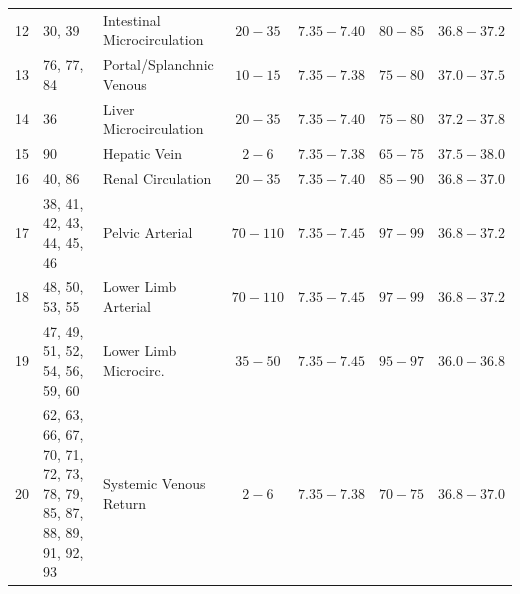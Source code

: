 \documentclass[sigconf]{acmart}
\begin{document}
\begin{table}[htbp]
\begin{tabular}{@{} c p{5.3cm} | l c c c c @{}}
    12 & 30, 39 & Intestinal Microcirculation & $20{-}35$ & $7.35{-}7.40$ & $80{-}85$ & $36.8{-}37.2$ \\ 
    13 & 76, 77, 84 & Portal/Splanchnic Venous & $10{-}15$ & $7.35{-}7.38$ & $75{-}80$ & $37.0{-}37.5$ \\ 
    14 & 36 & Liver Microcirculation & $20{-}35$ & $7.35{-}7.40$ & $75{-}80$ & $37.2{-}37.8$ \\ 
    15 & 90 & Hepatic Vein & $2{-}6$ & $7.35{-}7.38$ & $65{-}75$ & $37.5{-}38.0$ \\ 
    16 & 40, 86 & Renal Circulation & $20{-}35$ & $7.35{-}7.40$ & $85{-}90$ & $36.8{-}37.0$ \\ 
    17 & 38, 41, 42, 43, 44, 45, 46 & Pelvic Arterial & $70{-}110$ & $7.35{-}7.45$ & $97{-}99$ & $36.8{-}37.2$ \\ 
    18 & 48, 50, 53, 55 & Lower Limb Arterial & $70{-}110$ & $7.35{-}7.45$ & $97{-}99$ & $36.8{-}37.2$ \\ 
    19 & 47, 49, 51, 52, 54, 56, 59, 60 & Lower Limb Microcirc. & $35{-}50$ & $7.35{-}7.45$ & $95{-}97$ & $36.0{-}36.8$ \\ 
    20 & 62, 63, 66, 67, 70, 71, 72, 73, 78, 79, 85, 87, 88, 89, 91, 92, 93 & Systemic Venous Return & $2{-}6$ & $7.35{-}7.38$ & $70{-}75$ & $36.8{-}37.0$ \\ 
    \bottomrule
    

\end{tabular}
\end{table}
\end{document}
